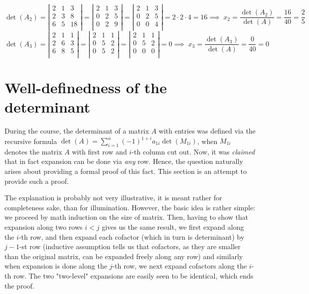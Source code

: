 \documentclass[8pt]{article} %
\begin{document}
\begin{myeg}
\[\det(A_2)=\left|\begin{array}{rrr}2&1&3\\2&3&8\\6&5&18\\
\end{array}\right|=
\left|\begin{array}{rrr}
	2&1&3\\0&2&5\\0&2&9\\
\end{array}\right|=
\left|\begin{array}{rrr}
	2&1&3\\0&2&5\\0&0&4\\
\end{array}\right|=2\cdot2\cdot4=16
	\implies\;x_2=\frac{\det(A_2)}{\det(A)}=\frac{16}{40}=\frac{2}{5}\]
\[\det(A_3)=
\left|\begin{array}{rrr}
2&1&1\\
2&6&3\\
6&8&5\\
\end{array}\right|=
\left|\begin{array}{rrr}
2&1&1\\
0&5&2\\
0&5&2\\
\end{array}\right|=
\left|\begin{array}{rrr}
2&1&1\\
0&5&2\\
0&0&0\\
\end{array}\right|=0
	\implies\;x_3=\frac{\det(A_3)}{\det(A)}=\frac{0}{40}=0\]
\end{myeg}
\section{Well-definedness of the determinant}
During the course, the determinant of a matrix $A$ with
entries was defined via the recursive formula $\det(A)=\sum_{i=1}^n(-1)^{1+i}a_{1i}\det(M_{1i})$,
when $M_{1i}$ denotes the matrix $A$ with first row and $i$-th column cut out. Now, it was \textit{claimed} that in fact expansion
can be done via \textit{any} row. Hence, the question naturally arises about providing a formal proof of this fact. This section
is an attempt to provide such a proof. 

The explanation is probably not very illustrative, it is meant rather for completeness sake, than for illumination. However, the basic idea
is rather simple: we proceed by math induction on the size of matrix. Then, having to show that expansion along two rows $i<j$ gives us the same
result, we first expand along the $i$-th row, and then expand each cofactor (which in turn is determinant) by $j-1$-st row (inductive assumption
tells us that cofactors, as they are smaller than the original matrix, can be expanded freely along any row) and similarly when
expansion is done along the $j$-th row, we next expand cofactors along the $i$-th row. The two "two-level" expansions are easily seen to be
identical, which ends the proof.
\end{document}
